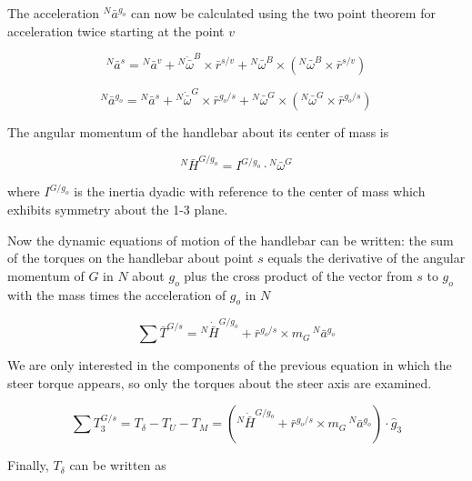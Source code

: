 \documentclass[a4paper]{article}
\begin{document}
The acceleration $^N\bar{a}^{g_o}$ can now be calculated using the two point theorem for
acceleration \cite{Kane1985} twice starting at the point $v$

\begin{equation}
  ^N\bar{a}^s = {}^N\bar{a}^v +
    {}^N\dot{\bar{\omega}}^B\times\bar{r}^{s/v} +
    {}^N\bar{\omega}^B\times({}^N\bar{\omega}^B\times\bar{r}^{s/v})
\end{equation}

\begin{equation}
  ^N\bar{a}^{g_o} = {}^N\bar{a}^s +
    {}^N\dot{\bar{\omega}}^G\times\bar{r}^{g_o/s} +
    {}^N\bar{\omega}^G\times({}^N\bar{\omega}^G\times\bar{r}^{g_o/s})
\end{equation}

The angular momentum of the handlebar about its center of mass is

\begin{equation}
  ^N\bar{H}^{G/g_o} = I^{G/g_o} \cdot {}^N\bar{\omega}^G
\end{equation}

where $I^{G/g_o}$ is the inertia dyadic with reference to the center of
mass which exhibits symmetry about the 1-3 plane.

Now the dynamic equations of motion of the handlebar can be written:
the sum of the torques on the handlebar about point $s$ equals the
derivative of the angular momentum of $G$ in $N$ about $g_o$ plus the
cross product of the vector from $s$ to $g_o$ with the mass times the
acceleration of $g_o$ in $N$ \cite{Meriam1975}

\begin{equation}
  \sum \bar{T}^{G/s} = {}^N\dot{\bar{H}}^{G/g_o} +
    \bar{r}^{g_o/s} \times m_G\,{}^N\bar{a}^{g_o}
\end{equation}

We are only interested in the components of the previous equation in
which the steer torque appears, so only the torques about the steer axis
are examined.

\begin{equation}
  \sum T^{G/s}_3 = T_\delta - T_U - T_M = \left({}^N\dot{\bar{H}}^{G/g_o} +
  \bar{r}^{g_o/s} \times m_G\,{}^N\bar{a}^{g_o}\right) \cdot \hat{g}_3
\end{equation}

Finally, $T_\delta$ can be written as
\end{document}
